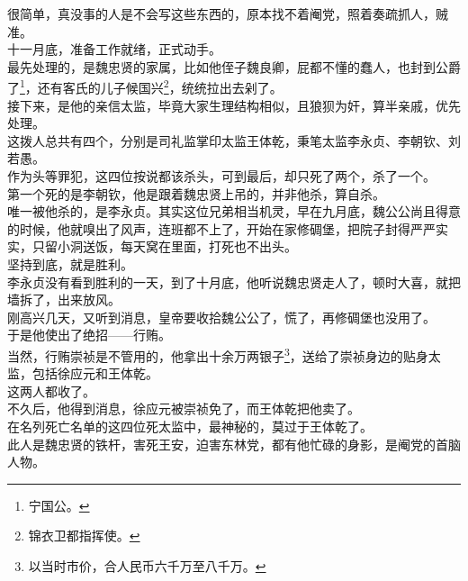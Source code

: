 \begin{multicols}{\theparacolNo}
很简单，真没事的人是不会写这些东西的，原本找不着阉党，照着奏疏抓人，贼准。\\

十一月底，准备工作就绪，正式动手。\\

最先处理的，是魏忠贤的家属，比如他侄子魏良卿，屁都不懂的蠢人，也封到公爵了\footnote{宁国公。}，还有客氏的儿子候国兴\footnote{锦衣卫都指挥使。}，统统拉出去剁了。\\

接下来，是他的亲信太监，毕竟大家生理结构相似，且狼狈为奸，算半亲戚，优先处理。\\

这拨人总共有四个，分别是司礼监掌印太监王体乾，秉笔太监李永贞、李朝钦、刘若愚。\\

作为头等罪犯，这四位按说都该杀头，可到最后，却只死了两个，杀了一个。\\

第一个死的是李朝钦，他是跟着魏忠贤上吊的，并非他杀，算自杀。\\

唯一被他杀的，是李永贞。其实这位兄弟相当机灵，早在九月底，魏公公尚且得意的时候，他就嗅出了风声，连班都不上了，开始在家修碉堡，把院子封得严严实实，只留小洞送饭，每天窝在里面，打死也不出头。\\

坚持到底，就是胜利。\\

李永贞没有看到胜利的一天，到了十月底，他听说魏忠贤走人了，顿时大喜，就把墙拆了，出来放风。\\

刚高兴几天，又听到消息，皇帝要收拾魏公公了，慌了，再修碉堡也没用了。\\

于是他使出了绝招——行贿。\\

当然，行贿崇祯是不管用的，他拿出十余万两银子\footnote{以当时市价，合人民币六千万至八千万。}，送给了崇祯身边的贴身太监，包括徐应元和王体乾。\\

这两人都收了。\\

不久后，他得到消息，徐应元被崇祯免了，而王体乾把他卖了。\\

在名列死亡名单的这四位死太监中，最神秘的，莫过于王体乾了。\\

此人是魏忠贤的铁杆，害死王安，迫害东林党，都有他忙碌的身影，是阉党的首脑人物。\\


\end{multicols}
